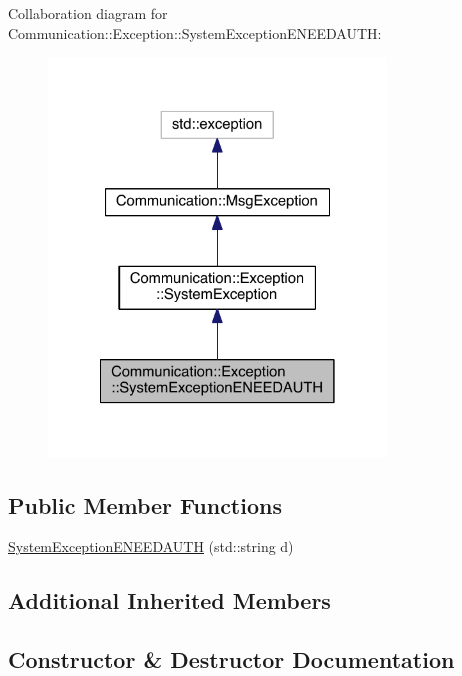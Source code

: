 Collaboration diagram for Communication\+:\+:Exception\+:\+:System\+Exception\+E\+N\+E\+E\+D\+A\+U\+T\+H\+:\nopagebreak
\begin{figure}[H]
\begin{center}
\leavevmode
\includegraphics[width=254pt]{class_communication_1_1_exception_1_1_system_exception_e_n_e_e_d_a_u_t_h__coll__graph}
\end{center}
\end{figure}
\subsection*{Public Member Functions}
\begin{DoxyCompactItemize}
\item 
\hyperlink{class_communication_1_1_exception_1_1_system_exception_e_n_e_e_d_a_u_t_h_aeb2cf3dd4380b446244dc10ee3e1e00e}{System\+Exception\+E\+N\+E\+E\+D\+A\+U\+T\+H} (std\+::string d)
\end{DoxyCompactItemize}
\subsection*{Additional Inherited Members}


\subsection{Constructor \& Destructor Documentation}
\hypertarget{class_communication_1_1_exception_1_1_system_exception_e_n_e_e_d_a_u_t_h_aeb2cf3dd4380b446244dc10ee3e1e00e}{}

